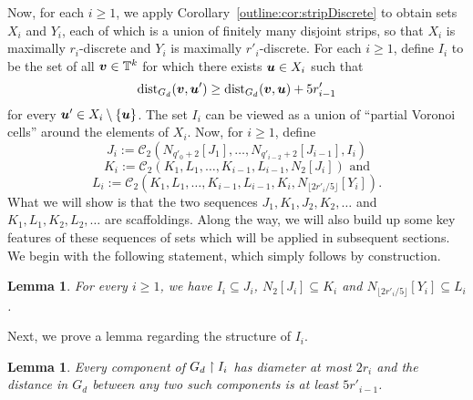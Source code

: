 \documentclass[12pt,a4paper]{amsart}
\numberwithin{equation}{section}
\newtheorem{lemma}[equation]{Lemma}
\theoremstyle{definition}
\begin{document}
Now, for each $i\geq1$, we apply Corollary~\ref{outline:cor:stripDiscrete} to obtain sets $X_i$ and $Y_i$, each of which is a union of finitely many disjoint strips, so that $X_i$ is maximally $r_i$-discrete and $Y_i$ is maximally $r'_i$-discrete. For each $i\geq1$, define $I_i$ to be the set of all $\boldsymbol{v}\in \mathbb{T}^k$ for which there exists $\boldsymbol{u}\in X_i$ such that
\[\operatorname{dist}_{G_d}(\boldsymbol{v},\boldsymbol{u}')\geq\operatorname{dist}_{G_d}(\boldsymbol{v},\boldsymbol{u})+5 r'_{i-1}\]
for every $\boldsymbol{u}'\in X_i\setminus \{\boldsymbol{u}\}$. The set $I_i$ can be viewed as a union of ``partial Voronoi cells'' around the elements of $X_i$. Now, for $i\geq1$, define
\[J_i:=\mathcal{C}_2(N_{q'_0+2}[J_1],\dots,N_{q'_{i-2}+2}[J_{i-1}],I_i)\]
\[K_i:=\mathcal{C}_2(K_1,L_1,\dots,K_{i-1},L_{i-1},N_2[J_i])\text{ and}\]
\[L_i:=\mathcal{C}_2(K_1,L_1,\dots,K_{i-1},L_{i-1},K_i,N_{\lfloor 2r'_i/5\rfloor}[Y_i]).\]
What we will show is that the two sequences $J_1,K_1,J_2,K_2,\dots$ and $K_1,L_1,K_2,L_2,\dots$ are scaffoldings. Along the way, we will also build up some key features of these sequences of sets which will be applied in subsequent sections. We begin with the following statement, which simply follows by construction.

\begin{lemma}
\label{lem:JKLtrivial}
For every $i\geq1$, we have $I_i\subseteq J_i$, $N_2[J_i]\subseteq K_i$ and $N_{\lfloor 2r'_i/5\rfloor}[Y_i]\subseteq L_i$.
\end{lemma}



Next, we prove a lemma regarding the structure of $I_i$. 

\begin{lemma}
\label{lem:Ii}
Every component of $G_d\upharpoonright I_i$ has diameter at most $2r_i$ and the distance in $G_d$ between any two such components is at least $5r'_{i-1}$. 
\end{lemma}
\end{document}
